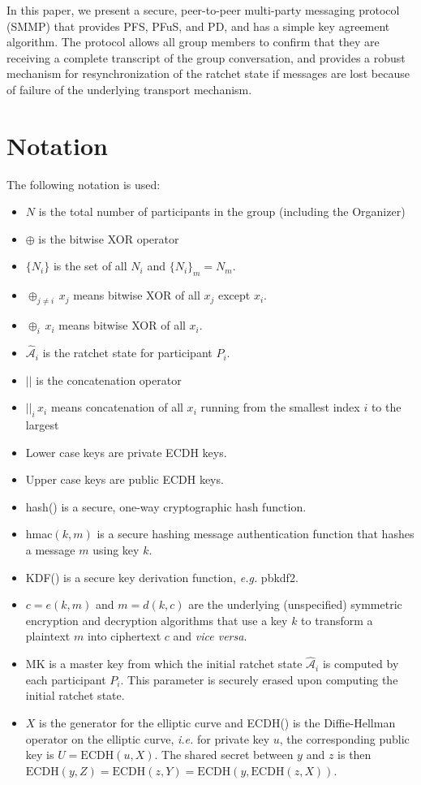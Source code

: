 \documentclass[%
preprint,
amsmath,amssymb,
aps,
prb,
floatfix,
]{revtex4-1}
\begin{document}
In this paper, we present a secure, peer-to-peer multi-party messaging protocol
(SMMP) that provides PFS, PFuS, and PD, and has a simple key agreement
algorithm. The protocol allows all group members to confirm that they are
receiving a complete transcript of the group conversation, and provides a
robust mechanism for resynchronization of the ratchet state if messages are lost
because of failure of the underlying transport mechanism.

\section{\label{sec:notation}Notation}
The following notation is used:
\begin{itemize}
\item $N$ is the total number of participants in the group (including the
Organizer)
\item $\oplus$ is the bitwise XOR operator
\item $\{N_i\}$ is the set of all $N_i$ and $\{N_i\}_m = N_m$.
\item $\oplus_{j \ne i} \, x_j$ means bitwise XOR of all $x_j$ except $x_i$.
\item  $\oplus_i \, x_i$ means bitwise XOR of all $x_i$.
\item $\mathcal{\hat{A}}_i$ is the ratchet state for
participant $P_i$.
\item $||$ is the concatenation operator
\item $||_i \, x_i$ means concatenation of all $x_i$ running from the smallest
index $i$ to the largest
\item Lower case keys are private ECDH keys.
\item Upper case keys are public ECDH keys.
\item hash() is a secure, one-way cryptographic hash function.
\item hmac$(k,m)$ is a secure hashing message authentication function that
hashes a message $m$ using key $k$.
\item KDF() is a secure key derivation function, \textit{e.g.} pbkdf2.
\item $c = e(k, m)$ and $m = d(k,c)$ are the underlying (unspecified) symmetric
encryption and decryption algorithms that use a key $k$ to transform a plaintext
$m$ into ciphertext $c$ and \textit{vice versa}.
\item MK is a master key from which the initial ratchet state
$\mathcal{\hat{A}}_i$ is computed by each participant $P_i$. This parameter is
securely erased upon computing the initial ratchet state.
\item $X$ is the generator for the elliptic curve and ECDH() is the Diffie-Hellman
operator on the elliptic curve, \textit{i.e.} for private key $u$, the
corresponding public key is $U = \mathrm{ECDH}(u, X)$. The shared secret between
$y$ and $z$ is then $ \mathrm{ECDH}(y,Z) = \mathrm{ECDH}(z,Y) =
\mathrm{ECDH}(y,\mathrm{ECDH}(z, X))$.
\end{itemize}
\end{document}
